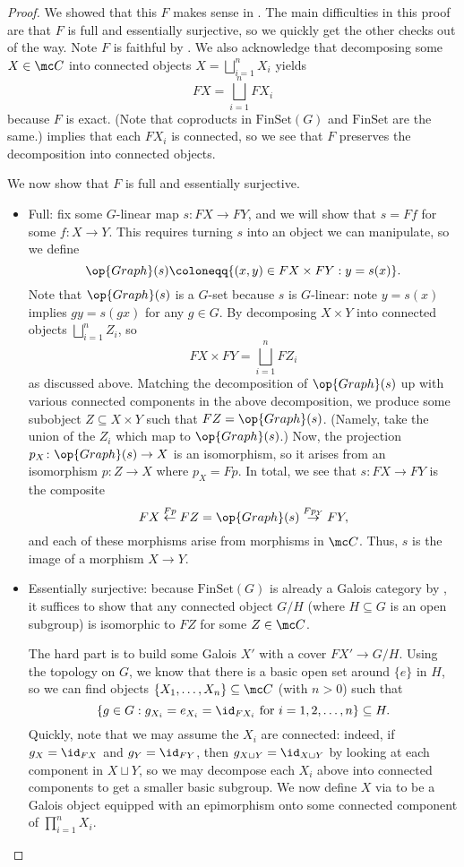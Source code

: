 \documentclass{amsart}
\begin{document}
\begin{proof}
    We showed that this $F$ makes sense in . The main difficulties in this proof are that $F$ is full and essentially surjective, so we quickly get the other checks out of the way. Note $F$ is faithful by . We also acknowledge that decomposing some $X\in\mc C$ into connected objects $X=\bigsqcup_{i=1}^nX_i$ yields
    \[FX=\bigsqcup_{i=1}^nFX_i\]
    because $F$ is exact. (Note that coproducts in $\mathrm{FinSet}(G)$ and $\mathrm{FinSet}$ are the same.)  implies that each $FX_i$ is connected, so we see that $F$ preserves the decomposition into connected objects.

    We now show that $F$ is full and essentially surjective.
    \begin{itemize}
        \item Full: fix some $G$-linear map $s\colon FX\to FY$, and we will show that $s=Ff$ for some $f\colon X\to Y$. This requires turning $s$ into an object we can manipulate, so we define
        \[\op{Graph}(s)\coloneqq\{(x,y)\in FX\times FY:y=s(x)\}.\]
        Note that $\op{Graph}(s)$ is a $G$-set because $s$ is $G$-linear: note $y=s(x)$ implies $gy=s(gx)$ for any $g\in G$. By decomposing $X\times Y$ into connected objects $\bigsqcup_{i=1}^nZ_i$, so
        \[FX\times FY=\bigsqcup_{i=1}^nFZ_i\]
        as discussed above. Matching the decomposition of $\op{Graph}(s)$ up with various connected components in the above decomposition, we produce some subobject $Z\subseteq X\times Y$ such that $FZ=\op{Graph}(s)$. (Namely, take the union of the $Z_i$ which map to $\op{Graph}(s)$.) Now, the projection $p_X\colon\op{Graph}(s)\to X$ is an isomorphism, so it arises from an isomorphism $p\colon Z\to X$ where $p_X=Fp$. In total, we see that $s\colon FX\to FY$ is the composite
        \[FX\stackrel{Fp}\leftarrow FZ=\op{Graph}(s)\stackrel{Fp_Y}\to FY,\]
        and each of these morphisms arise from morphisms in $\mc C$. Thus, $s$ is the image of a morphism $X\to Y$.
        \item Essentially surjective: because $\mathrm{FinSet}(G)$ is already a Galois category by , it suffices to show that any connected object $G/H$ (where $H\subseteq G$ is an open subgroup) is isomorphic to $FZ$ for some $Z\in\mc C$.
    
        The hard part is to build some Galois $X'$ with a cover $FX'\to G/H$. Using the topology on $G$, we know that there is a basic open set around $\{e\}$ in $H$, so we can find objects $\{X_1,\ldots,X_n\}\subseteq\mc C$ (with $n>0$) such that
        \[\left\{g\in G:g_{X_i}=e_{X_i}={\id_{FX_i}}\text{ for }i=1,2,\ldots,n\right\}\subseteq H.\]
        Quickly, note that we may assume the $X_i$ are connected: indeed, if $g_X=\id_{FX}$ and $g_Y=\id_{FY}$, then $g_{X\sqcup Y}=\id_{X\sqcup Y}$ by looking at each component in $X\sqcup Y$, so we may decompose each $X_i$ above into connected components to get a smaller basic subgroup. We now define $X$ via  to be a Galois object equipped with an epimorphism onto some connected component of $\prod_{i=1}^nX_i$.
        

\end{itemize}
\end{proof}
\end{document}
